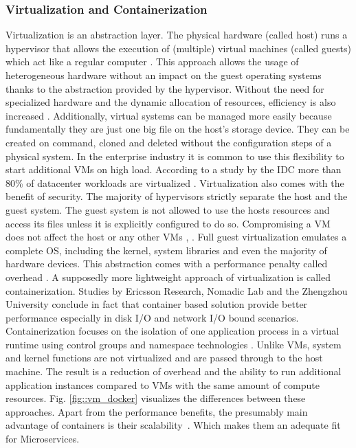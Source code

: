 \documentclass[12pt, a4paper]{article}
\begin{document}
        \subsubsection{Virtualization and Containerization}
        Virtualization is an abstraction layer. The physical hardware (called host) runs a hypervisor that allows the execution of (multiple) virtual machines (called guests) which act like a regular computer \cite{vmbasics}. This approach allows the usage of heterogeneous hardware without an impact on the guest operating systems thanks to the abstraction provided by the hypervisor. Without the need for specialized hardware and the dynamic allocation of resources, efficiency is also increased \cite{redhat_venv}. Additionally, virtual systems can be managed more easily because fundamentally they are just one big file on the host's storage device. They can be created on command, cloned and deleted without the configuration steps of a physical system. In the enterprise industry it is common to use this flexibility to start additional \ac{VM}s on high load. According to a study by the \ac{IDC} more than 80\% of datacenter workloads are virtualized \cite{virtualaddoption}. Virtualization also comes with the benefit of security. The majority of hypervisors strictly separate the host and the guest system. The guest system is not allowed to use the hosts resources and access its files unless it is explicitly configured to do so. Compromising a \ac{VM} does not affect the host or any other \ac{VM}s \cite{vmbasics}, \cite{redhat_venv}.\newline
        Full guest virtualization emulates a complete \ac{OS}, including the kernel, system libraries and even the majority of hardware devices. This abstraction comes with a performance penalty called overhead \cite{vmbasics}. A supposedly more lightweight approach of virtualization is called containerization. Studies by Ericsson Research, Nomadic Lab \cite{ieee_perfomance} and the Zhengzhou University \cite{zhengzhou_university} conclude in fact that container based solution provide better performance especially in disk \acs{I/O} and network \acs{I/O} bound scenarios. Containerization focuses on the isolation of one application process in a virtual runtime using control groups and namespace technologies \cite{cgroups}. Unlike \ac{VM}s, system and kernel functions are not virtualized and are passed through to the host machine. The result is a reduction of overhead and the ability to run additional application instances compared to \ac{VM}s with the same amount of compute resources. Fig. \ref{fig::vm_docker} visualizes the differences between these approaches.\newline
        Apart from the performance benefits, the presumably main advantage of containers is their scalability~\cite{cintainer_scale}. Which makes them an adequate fit for Microservices.
\end{document}
